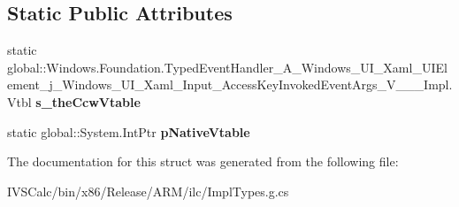 \subsection*{Static Public Attributes}
\begin{DoxyCompactItemize}
\item 
\mbox{\label{struct_windows_1_1_foundation_1_1_typed_event_handler___a___windows___u_i___xaml___u_i_element__faa94360fa5e602dc59cfec6def5e27f_a7798cc884830cd09396ae0e3104a8098}} 
static global\+::\+Windows.\+Foundation.\+Typed\+Event\+Handler\+\_\+\+A\+\_\+\+Windows\+\_\+\+U\+I\+\_\+\+Xaml\+\_\+\+U\+I\+Element\+\_\+j\+\_\+\+Windows\+\_\+\+U\+I\+\_\+\+Xaml\+\_\+\+Input\+\_\+\+Access\+Key\+Invoked\+Event\+Args\+\_\+\+V\+\_\+\+\_\+\+\_\+\+Impl.\+Vtbl {\bfseries s\+\_\+the\+Ccw\+Vtable}
\item 
\mbox{\label{struct_windows_1_1_foundation_1_1_typed_event_handler___a___windows___u_i___xaml___u_i_element__faa94360fa5e602dc59cfec6def5e27f_a89000ccbdc6140233b6dc193f2e586d6}} 
static global\+::\+System.\+Int\+Ptr {\bfseries p\+Native\+Vtable}
\end{DoxyCompactItemize}


The documentation for this struct was generated from the following file\+:\begin{DoxyCompactItemize}
\item 
I\+V\+S\+Calc/bin/x86/\+Release/\+A\+R\+M/ilc/Impl\+Types.\+g.\+cs\end{DoxyCompactItemize}
